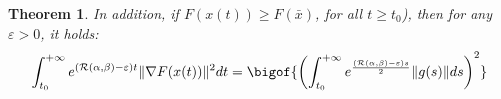 \documentclass[reqno]{amsart}
\theoremstyle{plain}
\newtheorem{theorem}{Theorem}	%
\theoremstyle{definition}
\theoremstyle{remark}
\DeclarePairedDelimiter{\norm}{\lVert}{\rVert}	%
\newcommand{\petito}[1]{o\mathopen{}\left(#1\right)}
\newcommand{\Rb}{\mathcal{R}}
\begin{document}
\begin{theorem}
In addition, if $F(x(t))\geq F(\bar{x})$,  for all $t\geq t_{0}$), then for any $\varepsilon>0$, it holds:
\begin{equation}\label{estimate grad basic teo first}
	\int_{t_{0}}^{+\infty}e^{(\Rb(\alpha,\beta)-\varepsilon)t}\norm{\nabla F(x(t))}^2dt = \bigof{\left(\int_{t_{0}}^{+\infty}e^{\frac{(\Rb(\alpha,\beta)-\varepsilon)s}{2}}\norm{g(s)}ds\right)^{2}}
\end{equation} 
\end{theorem}
\end{document}
